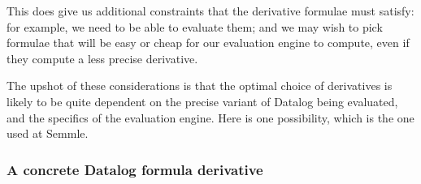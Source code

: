 This does give us additional constraints that the derivative formulae must satisfy:
for example, we need to be able to evaluate them; and we may wish to pick formulae that will be easy or cheap
for our evaluation engine to compute, even if they compute a less precise derivative.

The upshot of these considerations is that the optimal choice of derivatives is likely
to be quite dependent on the precise variant of Datalog being evaluated, and the
specifics of the evaluation engine. Here is one possibility, which is the one used at Semmle.

\subsubsection{A concrete Datalog formula derivative}
\newcommand{\bothdiff}{{\mathsf X}} 

